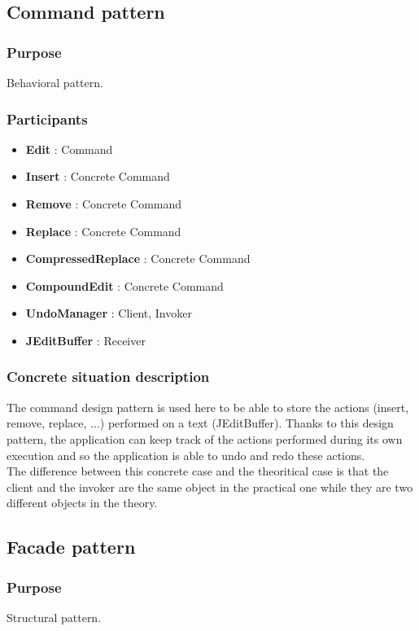 \documentclass[a4paper,10pt]{article}
\begin{document}
\subsection{Command pattern}
\subsubsection{Purpose}
Behavioral pattern.
\subsubsection[Participants]{Participants\footnotemark[1]}
\begin{itemize}
 \item \textbf{Edit} : Command
 \item \textbf{Insert} : Concrete Command
 \item \textbf{Remove} : Concrete Command
 \item \textbf{Replace} : Concrete Command
 \item \textbf{CompressedReplace} : Concrete Command
 \item \textbf{CompoundEdit} : Concrete Command
 \item \textbf{UndoManager} : Client, Invoker
 \item \textbf{JEditBuffer} : Receiver
\end{itemize}

\subsubsection{Concrete situation description}
The command design pattern is used here to be able to store the actions (insert, remove, replace, ...) performed on a text (JEditBuffer). Thanks to this design pattern, the application can keep track of the actions performed during its own execution and so the application is able to undo and redo these actions. \\
The difference between this concrete case and the theoritical case is that the client and the invoker are the same object in the practical one while they are two different objects in the theory.

\subsection{Facade pattern}
\subsubsection{Purpose}
Structural pattern.
\end{document}
